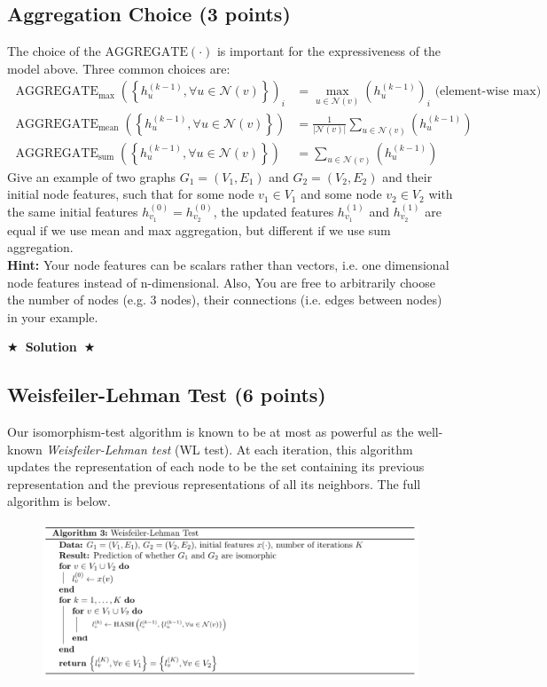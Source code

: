 \documentclass{article}
\numberwithin{figure}{section}
\newcommand{\Solution}[1]{{\medskip \color{red} \bf $\bigstar$~\sf \textbf{Solution}~$\bigstar$ \sf #1 } \bigskip}
\begin{document}
\subsection{Aggregation Choice (3 points)} 
The choice of the $\operatorname{AGGREGATE(\cdot)}$ is important for the expressiveness of the model above. Three common choices are: $$
\begin{aligned}
\operatorname{AGGREGATE}_{\max }\left(\left\{h_u^{(k-1)}, \forall u \in \mathcal{N}(v)\right\}\right)_i & =\max _{u \in \mathcal{N}(v)}\left(h_u^{(k-1)}\right)_i \text { (element-wise max)} \\
\operatorname{AGGREGATE}_{\text {mean}}\left(\left\{h_u^{(k-1)}, \forall u \in \mathcal{N}(v)\right\}\right) & =\frac{1}{|\mathcal{N}(v)|} \sum_{u \in \mathcal{N}(v)}\left(h_u^{(k-1)}\right) \\
\operatorname{AGGREGATE}_{\text {sum}}\left(\left\{h_u^{(k-1)}, \forall u \in \mathcal{N}(v)\right\}\right) & =\sum_{u \in \mathcal{N}(v)}\left(h_u^{(k-1)}\right)
\end{aligned}
$$
Give an example of two graphs $G_1 = (V_1, E_1)$ and $G_2 = (V_2, E_2)$ and their initial node features, such that for some node $v_1 \in V_1$ and some node $v_2 \in V_2$ with the same initial features $h^{(0)}_{v_1} = h^{(0)}_{v_2}$, the updated features $h^{(1)}_{v_1}$ and $h^{(1)}_{v_2}$ are equal if we use mean and max aggregation, but different if 
we use sum aggregation.\\
\textbf{Hint:} Your node features can be scalars rather than vectors, i.e. one dimensional node features instead of n-dimensional. Also, You are free to arbitrarily choose the number of nodes (e.g. 3 nodes), their connections (i.e. edges between
nodes) in your example.

\Solution{}


\subsection{Weisfeiler-Lehman Test (6 points)}
Our isomorphism-test algorithm is known to be at most as powerful as the well-known \textit{Weisfeiler-Lehman test} (WL test). At each iteration, this algorithm updates the representation of each node to be the set containing its previous representation and the previous representations of all its neighbors. The full algorithm is below.

    \begin{figure}[H]
        \centering
        \includegraphics[width=1.0\textwidth]{CS224W_Homework1/algo-3.png}
        \label{fig:my_label}
    \end{figure}
\end{document}
